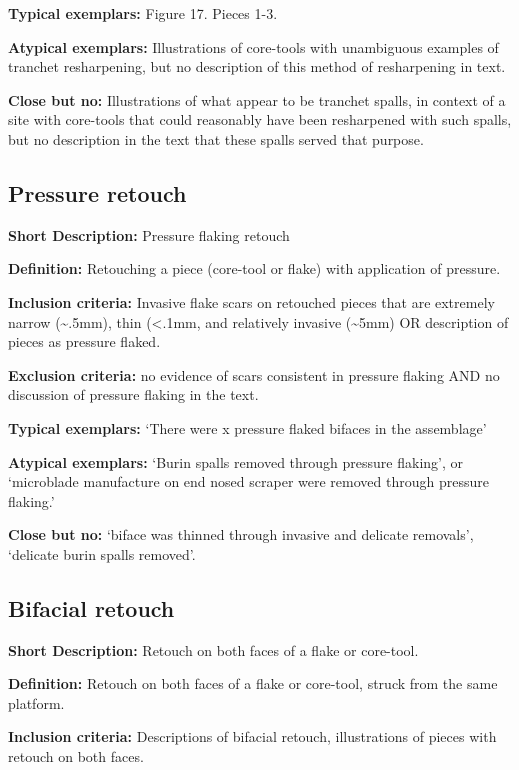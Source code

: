 \documentclass[
]{article}
\begin{document}
\textbf{Typical exemplars:} Figure 17. Pieces 1-3.

\textbf{Atypical exemplars:} Illustrations of core-tools with
unambiguous examples of tranchet resharpening, but no description of
this method of resharpening in text.

\textbf{Close but no:} Illustrations of what appear to be tranchet
spalls, in context of a site with core-tools that could reasonably have
been resharpened with such spalls, but no description in the text that
these spalls served that purpose.

\hypertarget{pressure-retouch}{%
\subsection{Pressure retouch}\label{pressure-retouch}}

\textbf{Short Description:} Pressure flaking retouch

\textbf{Definition:} Retouching a piece (core-tool or flake) with
application of pressure.

\textbf{Inclusion criteria:} Invasive flake scars on retouched pieces
that are extremely narrow (\textasciitilde.5mm), thin (\textless.1mm,
and relatively invasive (\textasciitilde5mm) OR description of pieces as
pressure flaked.

\textbf{Exclusion criteria:} no evidence of scars consistent in pressure
flaking AND no discussion of pressure flaking in the text.

\textbf{Typical exemplars:} `There were x pressure flaked bifaces in the
assemblage'

\textbf{Atypical exemplars:} `Burin spalls removed through pressure
flaking', or `microblade manufacture on end nosed scraper were removed
through pressure flaking.'

\textbf{Close but no:} `biface was thinned through invasive and delicate
removals', `delicate burin spalls removed'.

\hypertarget{bifacial-retouch}{%
\subsection{Bifacial retouch}\label{bifacial-retouch}}

\textbf{Short Description:} Retouch on both faces of a flake or
core-tool.

\textbf{Definition:} Retouch on both faces of a flake or core-tool,
struck from the same platform.

\textbf{Inclusion criteria:} Descriptions of bifacial retouch,
illustrations of pieces with retouch on both faces.
\end{document}
